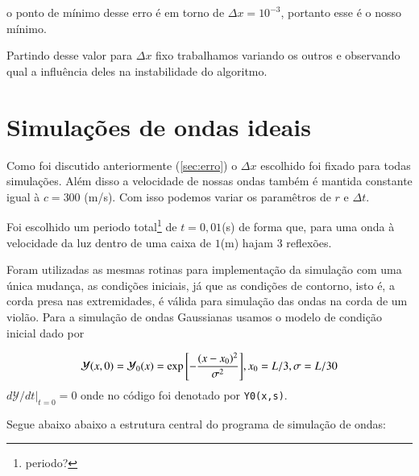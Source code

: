 \documentclass[a4paper, 11pt]{article}
\begin{document}
o ponto de mínimo desse erro é em torno de \( \Delta x = 10^{-3} \), portanto esse é o nosso mínimo.

Partindo desse valor para \( \Delta x\) fixo trabalhamos variando os outros e observando qual a
influência deles na instabilidade do algoritmo.

\section{Simulações de ondas ideais}


Como foi discutido anteriormente (\ref{sec:erro}) o $\Delta x$ escolhido
foi fixado para todas simulações. Além disso a velocidade de nossas ondas também é mantida constante
igual à \( c = 300\) (m/s). Com isso podemos variar os paramêtros de \( r \) e \( \Delta t \). 

Foi escolhido um periodo total\footnote{periodo?} de \( t = 0,01\)(s)  de forma que, para uma onda à velocidade da luz
dentro de uma caixa de \( 1\)(m) hajam 3 reflexões.


Foram utilizadas as mesmas rotinas para implementação da simulação com uma única mudança, as
condições iniciais, já que as condições de contorno, isto é, a corda presa nas extremidades, é
válida para simulação das ondas na corda de um violão. Para a simulação de ondas Gaussianas usamos o
modelo de condição inicial dado por 

\begin{equation}
    \mathcal{Y}(x, 0) = \mathcal{Y}_0 (x) = \exp{\left[- \frac{(x-x_0)^2}{\sigma^2}\right]}, x_0 = L/3, \sigma = L/30 \\
  \label{eq:y_0}
\end{equation}
\( d \mathcal{Y} / d t |_{t = 0} = 0 \)
onde no código foi denotado por  \verb|Y0(x,s)|.


Segue abaixo abaixo a estrutura central do programa de simulação de ondas:
\end{document}
